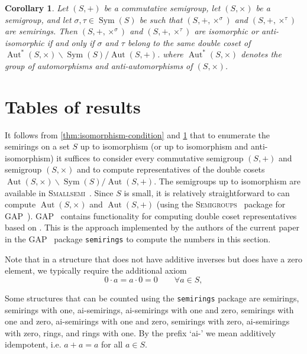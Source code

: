 \documentclass{article}
\theoremstyle{definition}
\theoremstyle{plain}
\newtheorem{cor}[defn]{Corollary}
\newcommand{\GAP}{\textsc{GAP}~\cite{GAP4}\xspace}
\newcommand{\Smallsemi}{\textsc{Smallsemi}~\cite{Smallsemi}\xspace}
\newcommand{\Semigroups}{\textsc{Semigroups}~\cite{Semigroups}\xspace}
\newcommand{\Sym}{\operatorname{Sym}}
\newcommand{\Aut}{\operatorname{Aut}}
\begin{document}
\begin{cor}
  \label{cor:equiv-condition}
  Let \((S, +)\) be a commutative semigroup, let \((S, \times)\) be a semigroup,
  and let \(\sigma, \tau\in\Sym(S)\) be such that $(S, +, \times ^ \sigma)$ and
  $(S, +, \times ^ \tau)$ are semirings.
  Then \((S, +, \times ^ \sigma)\) and \((S, +, \times^\tau)\) are isomorphic or anti-isomorphic if and only if \(\sigma\) and \(\tau\) belong to the same double coset of \(\Aut^*(S, \times) \backslash \Sym(S) / \Aut(S, +)\).
  where \(\Aut^*(S, \times)\) denotes the group of
  automorphisms and anti-automorphisms of \((S, \times)\).
\end{cor}

\section{Tables of results}

It follows from \cref{thm:isomorphism-condition} and
\cref{cor:equiv-condition} that to enumerate the
semirings on a set $S$ up to isomorphism (or up to isomorphism and
anti-isomorphism) it suffices to consider every
commutative semigroup $(S, +)$ and semigroup $(S, \times)$
and to compute representatives of the double cosets \(\Aut(S, \times)
\backslash \Sym(S) / \Aut(S, +)\). The semigroups up to isomorphism are
available in \Smallsemi.  Since $S$ is small, it is relatively
straightforward to can compute $\Aut(S, \times)$ and $\Aut(S, +)$ (using the
\Semigroups package for \GAP).
\GAP contains functionality for computing double coset
representatives based on \cite{}. This is the approach implemented by the
authors of the current paper in the \GAP package \texttt{semirings} to compute
the numbers in this section.

Note that in a structure that does not have additive inverses but
does have a zero element, we typically require the additional axiom
\begin{equation}
  \label{eq:rig-axiom}
  0\cdot a=a\cdot0=0\qquad\forall a\in S,
\end{equation}

Some structures that can be counted using the
\texttt{semirings} package are semirings, semirings with one, ai-semirings, ai-semirings with one and zero, semirings with one and zero, ai-semirings with one and zero, semirings with zero, ai-semirings with zero, rings, and rings with one. By the prefix `ai-' we mean additively idempotent, i.e. $a + a = a$ for all $a\in S$.
\end{document}
